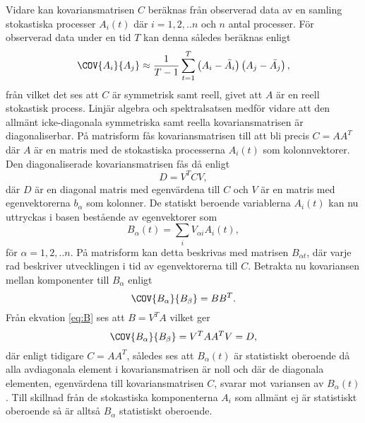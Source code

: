 
Vidare kan kovariansmatrisen $C$ beräknas från observerad data av en samling stokastiska processer $A_i(t)$ där $i=1,2,..n$ och $n$ antal processer. För observerad data under en tid $T$ kan denna således beräknas enligt 
\begin{equation}
     \COV{A_i}{A_j} \approx \frac{1}{T-1}\sum_{t=1}^T \left(A_i-\bar{A_i}\right)\left(A_j-\bar{A_j}\right),
\end{equation}
från vilket det ses att $C$ är symmetrisk samt reell, givet att $A$ är en reell stokastisk process. Linjär algebra och spektralsatsen medför vidare att den allmänt icke-diagonala symmetriska samt reella kovariansmatrisen är diagonaliserbar. På matrisform fås kovariansmatrisen till att bli precis $C=AA^T$ där $A$ är en matris med de stokastiska processerna $A_i(t)$ som kolonnvektorer. Den diagonaliserade kovariansmatrisen fås då enligt 
\begin{equation}
    D = V^TCV,
\end{equation}
där $D$ är en diagonal matris med egenvärdena till $C$ och $V$ är en matris med egenvektorerna $b_\alpha$ som kolonner. De statiskt beroende variablerna $A_i(t)$ kan nu uttryckas i basen bestående av egenvektorer som
\begin{equation}
\label{eq:B}
    B_{\alpha}(t) = \sum_i V_{\alpha i}A_i(t),
\end{equation}
för $\alpha = 1,2,..n$. På matrisform kan detta beskrivas med matrisen $B_{\alpha t}$, där varje rad beskriver utvecklingen i tid av egenvektorerna till $C$. Betrakta nu kovariansen mellan komponenter till $B_{\alpha}$  enligt 
\begin{equation}
    \COV{B_{\alpha}}{B_{\beta}} = BB^T. 
\end{equation}
Från ekvation \ref{eq:B} ses att $B=V^TA$ vilket ger 
\begin{equation}
    \COV{B_{\alpha}}{B_{\beta}} = V^TAA^TV = D,
\end{equation}
där enligt tidigare $C=AA^T$, således ses att $B_{\alpha}(t)$ är statistiskt oberoende då alla avdiagonala element i kovariansmatrisen är noll och där de diagonala elementen, egenvärdena till kovariansmatrisen $C$, svarar mot variansen av $B_{\alpha}(t)$. Till skillnad från de stokastiska komponenterna $A_i$ som allmänt ej är statistiskt oberoende så är alltså $B_\alpha$ statistiskt oberoende. %

